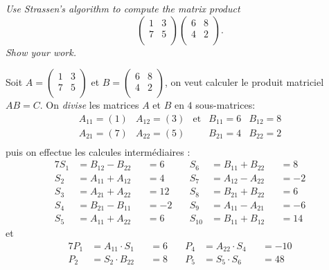 \begin{description}
   {\itshape Use Strassen’s algorithm to compute the matrix product $$\begin{pmatrix}
      1 & 3\\
      7 & 5\\
    \end{pmatrix}
    \begin{pmatrix}
      6 & 8\\
      4 & 2\\
    \end{pmatrix}.$$ 
  Show your work.}

    \begin{ex}
      Soit $A = \begin{pmatrix}
      1 & 3\\
      7 & 5\\   
    \end{pmatrix} $ et $ B = \begin{pmatrix}
      6 & 8\\
      4 & 2\\
    \end{pmatrix}$, on veut calculer le produit matriciel $AB=C$.
    On {\it divise} les matrices $A$ et $B$ en $4$ sous-matrices: $$\begin{array}{ccccc}
      A_{11} = (1) & A_{12} = (3) & \text{et} & B_{11} = 6& B_{12} = 8\\
      A_{21} = (7) & A_{22} = (5) &&B_{21} = 4& B_{22} = 2\\
    \end{array}
    $$ puis on effectue les calcules interm\'ediaires :
    \begin{alignat*}{7}
    S_1 &= B_{12} - B_{22} &&= 6 &\quad S_6&=B_{11} + B_{22}&&= 8\\
    S_2 &= A_{11} + A_{12} &&= 4 &\quad S_7&=A_{12} - A_{22}&&=-2\\
    S_3 &= A_{21} + A_{22} &&= 12 &\quad S_8&=B_{21}+ B_{22} &&=6\\
    S_4 &= B_{21} - B_{11} &&= -2&\quad S_9&=A_{11}-A_{21}&&=-6\\
    S_5 &= A_{11} + A_{22} &&= 6 &\quad S_{10}&=B_{11}+B_{12}&&=14
    \end{alignat*} et
    \begin{alignat*}{7}
      P_1 &= A_{11}\cdot S_1 &&= 6 &\quad P_4 &= A_{22}\cdot S_4 &&=  -10\\
      P_2 &= S_2\cdot B_{22} &&= 8 &\quad P_5 &= S_5\cdot S_6 &&= 48\\

\end{alignat*}
\end{ex}
\end{description}
